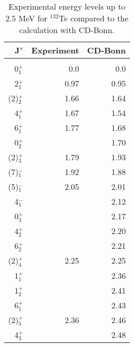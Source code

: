 \documentclass[aps,twocolumn,superscriptaddress,prc,showpacs]{revtex4}
\begin{document}
\begin{table}
 \caption{\label{tabte134}
Experimental energy levels up to 2.5 MeV for $^{132}$Te compared to
the calculation with CD-Bonn.}
\begin{ruledtabular}
\begin{tabular}{rrr}
J$^{ \pi }$ & Experiment & CD-Bonn  \\
\hline \\
  0$^{ + }_{1}$ & 0.0      & 0.0    \\
  2$^{ + }_{1}$ & 0.97     & 0.95    \\
  (2)$^{ + }_{2}$ & 1.66   & 1.64   \\
  4$^{ + }_{1}$ & 1.67     & 1.54   \\
  6$^{ + }_{1}$ & 1.77     & 1.68   \\
  0$^{ + }_{2}$ &          & 1.70   \\
  (2)$^{ + }_{3}$ & 1.79   & 1.93   \\
  (7)$^{ - }_{1}$ & 1.92   & 1.88   \\
  (5)$^{ - }_{1}$ & 2.05   & 2.01   \\
  4$^{ - }_{1}$ &          & 2.12   \\
  0$^{ + }_{3}$ &          & 2.17   \\
  4$^{ + }_{2}$ &          & 2.20   \\
  6$^{ + }_{2}$ &          & 2.21   \\
  (2)$^{ + }_{4}$ & 2.25   & 2.25  \\
  1$^{ + }_{1}$ &          & 2.36   \\
  1$^{ + }_{2}$ &          & 2.41   \\
  6$^{ + }_{1}$ &          & 2.43   \\
  (2)$^{ + }_{5}$ & 2.36   & 2.46   \\
  4$^{ + }_{3}$ &          & 2.48   \\
\end{tabular}
\end{ruledtabular}
\end{table}
\endgroup
\end{document}
